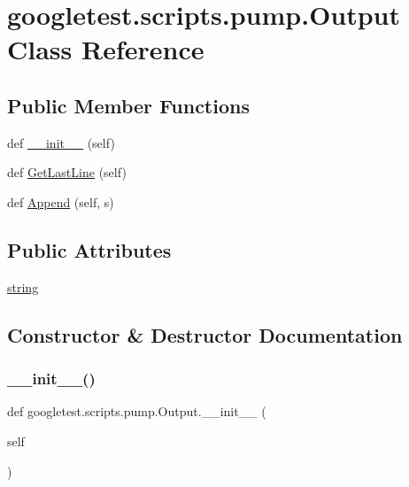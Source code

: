 \hypertarget{classgoogletest_1_1scripts_1_1pump_1_1_output}{}\section{googletest.\+scripts.\+pump.\+Output Class Reference}
\label{classgoogletest_1_1scripts_1_1pump_1_1_output}
\subsection*{Public Member Functions}
\begin{DoxyCompactItemize}
\item 
def \mbox{\hyperlink{classgoogletest_1_1scripts_1_1pump_1_1_output_acbb74138d16eea19dd050d0474d648fe}{\+\_\+\+\_\+init\+\_\+\+\_\+}} (self)
\item 
def \mbox{\hyperlink{classgoogletest_1_1scripts_1_1pump_1_1_output_a3be5ce6e134604ef8f16402bd9adee45}{Get\+Last\+Line}} (self)
\item 
def \mbox{\hyperlink{classgoogletest_1_1scripts_1_1pump_1_1_output_a015715c9821055eddad23eb8182e8a84}{Append}} (self, s)
\end{DoxyCompactItemize}
\subsection*{Public Attributes}
\begin{DoxyCompactItemize}
\item 
\mbox{\hyperlink{classgoogletest_1_1scripts_1_1pump_1_1_output_a08efd1fdb2c4c75fadab06c111ab8ff2}{string}}
\end{DoxyCompactItemize}


\subsection{Constructor \& Destructor Documentation}
\mbox{\label{classgoogletest_1_1scripts_1_1pump_1_1_output_acbb74138d16eea19dd050d0474d648fe}} 
\subsubsection{\texorpdfstring{\_\_init\_\_()}{\_\_init\_\_()}}
{\footnotesize\ttfamily def googletest.\+scripts.\+pump.\+Output.\+\_\+\+\_\+init\+\_\+\+\_\+ (\begin{DoxyParamCaption}\item[{}]{self }\end{DoxyParamCaption})}



